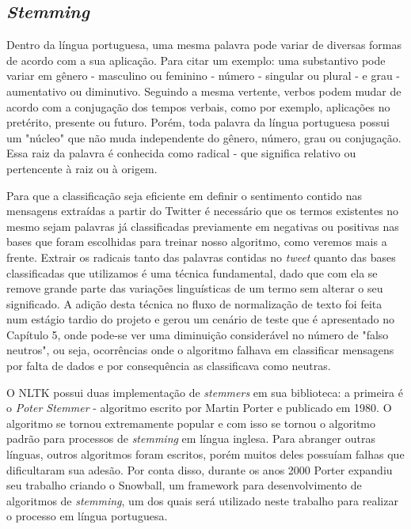 \subsection{\textit{Stemming}}

Dentro da língua portuguesa, uma mesma palavra pode variar de diversas formas de acordo com a sua aplicação. Para citar um exemplo: uma substantivo pode variar em gênero - masculino ou feminino - número - singular ou plural - e grau - aumentativo ou diminutivo. Seguindo a mesma vertente, verbos podem mudar de acordo com a conjugação dos tempos verbais, como por exemplo, aplicações no pretérito, presente ou futuro.
Porém, toda palavra da língua portuguesa possui um "núcleo" que não muda independente do gênero, número, grau ou conjugação. Essa raiz da palavra é conhecida como radical - que significa relativo ou pertencente à raiz ou à origem. 

Para que a classificação seja eficiente em definir o sentimento contido nas mensagens extraídas a partir do Twitter é necessário que os termos existentes no mesmo sejam palavras já classificadas previamente em negativas ou positivas nas bases que foram escolhidas para treinar nosso algoritmo, como veremos mais a frente. Extrair os radicais tanto das palavras contidas no \textit{tweet} quanto das bases classificadas que utilizamos é uma técnica fundamental, dado que com ela se remove grande parte das variações linguísticas de um termo sem alterar o seu significado. A adição desta técnica no fluxo de normalização de texto foi feita num estágio tardio do projeto e gerou um cenário de teste que é apresentado no Capítulo 5, onde pode-se ver uma diminuição considerável no número de "falso neutros", ou seja, ocorrências onde o algoritmo falhava em classificar mensagens por falta de dados e por consequência as classificava como neutras.

O NLTK possui duas implementação de \textit{stemmers} em sua biblioteca: a primeira é o \textit{Poter Stemmer} - algoritmo escrito por Martin Porter e publicado em 1980. O algoritmo se tornou extremamente popular e com isso se tornou o algoritmo padrão para processos de \textit{stemming} em língua inglesa. Para abranger outras línguas, outros algoritmos foram escritos, porém muitos deles possuíam falhas que dificultaram sua adesão. Por conta disso, durante os anos 2000 Porter expandiu seu trabalho criando o Snowball\cite{snowball}, um framework para desenvolvimento de algoritmos de \textit{stemming}, um dos quais será utilizado neste trabalho para realizar o processo em língua portuguesa. 


